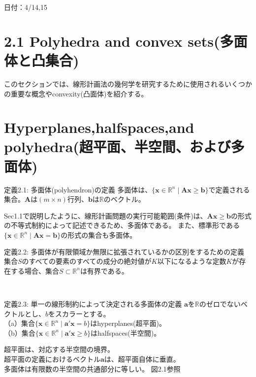 \documentclass{jsarticle}
\begin{document}
日付：4/14,15

\section*{2.1 Polyhedra and convex sets(多面体と凸集合)}

このセクションでは、線形計画法の幾何学を研究するために使用されるいくつかの重要な概念やconvexity(凸面体)を紹介する。 

\section*{Hyperplanes,halfspaces,and polyhedra(超平面、半空間、および多面体)}

\begin{itembox}[l]{定義2.1: 多面体(polyhendron)の定義}
多面体は、$\{\bm{x}\in \mathbb{R}^n\mid \bm{A}\bm{x} \geq \bm{b}\}$で定義される集合。$\bm{A}$は$(m \times n)$行列、$\bm{b}$は$\mathbb{R}$のベクトル。
\end{itembox}
Sec1.1で説明したように、線形計画問題の実行可能範囲(条件)は、$\bm{A}\bm{x}\geq\bm{b}$の形式の不等式制約によって記述できるため、多面体である。 また、標準形である$\{\bm{x}\in \mathbb{R}^n\mid \bm{A}\bm{x}=\bm{b}\}$の形式の集合も多面体。\\
 
\begin{itembox}[l]{定義2.2: 多面体が有限領域か無限に拡張されているかの区別をするための定義}
集合$S$のすべての要素のすべての成分の絶対値が$K$以下になるような定数$K$が存在する場合、集合$S \subset \mathbb{R}^n$は有界である。
\end{itembox}
 \\
\begin{itembox}[l]{定義2.3: 単一の線形制約によって決定される多面体の定義}
$\bm{a}$を$\mathbb{R}$のゼロでないベクトルとし、$b$をスカラーとする。  \\
（a）集合$\{\bm{x}\in \mathbb{R}^n\mid \bm{a}'\bm{x} = b\}$はhyperplanes(超平面)。\\
（b）集合$\{\bm{x}\in \mathbb{R}^n\mid \bm{a}'\bm{x} \geq b\}$はhalfspaces(半空間)。
\end{itembox}
超平面は、対応する半空間の境界。\\
超平面の定義におけるベクトル$\bm{a}$は、超平面自体に垂直。\\
多面体は有限数の半空間の共通部分に等しい。 図2.1参照

\newpage
\end{document}
